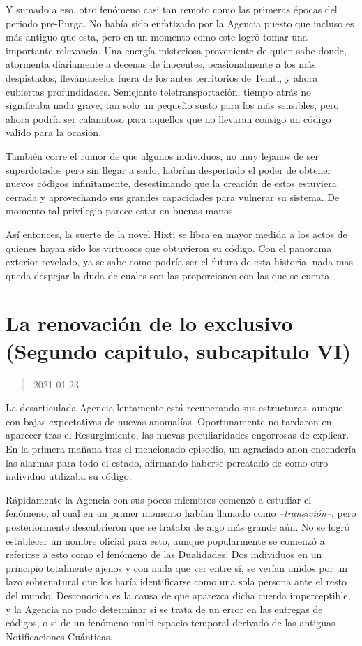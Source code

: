 \documentclass[
  spanish,
]{book}
\begin{document}
Y sumado a eso, otro fenómeno casi tan remoto como las primeras épocas del periodo pre-Purga. No había sido enfatizado por la Agencia puesto que incluso es más antiguo que esta, pero en un momento como este logró tomar una importante relevancia. Una energía misteriosa proveniente de quien sabe donde, atormenta diariamente a decenas de inocentes, ocasionalmente a los más despistados, llevándoselos fuera de los antes territorios de Temti, y ahora cubiertas profundidades. Semejante teletransportación, tiempo atrás no significaba nada grave, tan solo un pequeño susto para los más sensibles, pero ahora podría ser calamitoso para aquellos que no llevaran consigo un código valido para la ocasión.

También corre el rumor de que algunos individuos, no muy lejanos de ser superdotados pero sin llegar a serlo, habrían despertado el poder de obtener nuevos códigos infinitamente, desestimando que la creación de estos estuviera cerrada y aprovechando sus grandes capacidades para vulnerar su sistema. De momento tal privilegio parece estar en buenas manos.

Así entonces, la suerte de la novel Hixti se libra en mayor medida a los actos de quienes hayan sido los virtuosos que obtuvieron su código. Con el panorama exterior revelado, ya se sabe como podría ser el futuro de esta historia, nada mas queda despejar la duda de cuales son las proporciones con las que se cuenta.

\hypertarget{la-renovaciuxf3n-de-lo-exclusivo-segundo-capitulo-subcapitulo-vi}{%
\section{La renovación de lo exclusivo (Segundo capitulo, subcapitulo VI)}\label{la-renovaciuxf3n-de-lo-exclusivo-segundo-capitulo-subcapitulo-vi}}

\begin{quote}
2021-01-23
\end{quote}

La desarticulada Agencia lentamente está recuperando sus estructuras, aunque con bajas expectativas de nuevas anomalías. Oportunamente no tardaron en aparecer tras el Resurgimiento, las nuevas peculiaridades engorrosas de explicar. En la primera mañana tras el mencionado episodio, un agraciado anon encendería las alarmas para todo el estado, afirmando haberse percatado de como otro individuo utilizaba su código.

Rápidamente la Agencia con sus pocos miembros comenzó a estudiar el fenómeno, al cual en un primer momento habían llamado como \emph{--transición--}, pero posteriormente descubrieron que se trataba de algo más grande aún. No se logró establecer un nombre oficial para esto, aunque popularmente se comenzó a referirse a esto como el fenómeno de las Dualidades.
Dos individuos en un principio totalmente ajenos y con nada que ver entre sí, se verían unidos por un lazo sobrenatural que los haría identificarse como una sola persona ante el resto del mundo. Desconocida es la causa de que aparezca dicha cuerda imperceptible, y la Agencia no pudo determinar si se trata de un error en las entregas de códigos, o si de un fenómeno multi espacio-temporal derivado de las antiguas Notificaciones Cuánticas.
\end{document}
